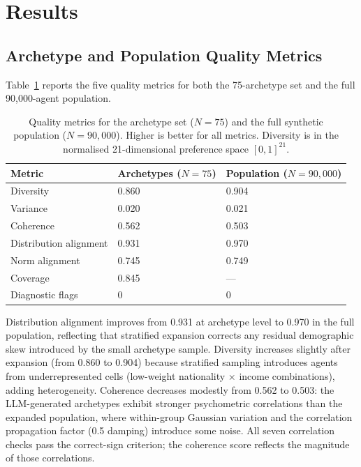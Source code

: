 \documentclass[sustainability,article,submit,pdftex,moreauthors]{Definitions/mdpi}
\begin{document}
\section{Results}
\label{sec:results}

\subsection{Archetype and Population Quality Metrics}
\label{subsec:metrics_results}

Table~\ref{tab:metrics} reports the five quality metrics for both the
75-archetype set and the full 90,000-agent population.

\begin{table}[H]
\caption{Quality metrics for the archetype set ($N = 75$) and the full
synthetic population ($N = 90{,}000$). Higher is better for all metrics.
Diversity is in the normalised 21-dimensional preference space $[0,1]^{21}$.}
\label{tab:metrics}
\begin{tabularx}{\textwidth}{lXX}
\toprule
\textbf{Metric}              & \textbf{Archetypes ($N=75$)} & \textbf{Population ($N=90{,}000$)} \\
\midrule
Diversity                   & 0.860 & 0.904 \\
Variance                    & 0.020 & 0.021 \\
Coherence                   & 0.562 & 0.503 \\
Distribution alignment      & 0.931 & 0.970 \\
Norm alignment              & 0.745 & 0.749 \\
Coverage                    & 0.845 & --- \\
Diagnostic flags            & 0     & 0     \\
\bottomrule
\end{tabularx}
\end{table}

Distribution alignment improves from 0.931 at archetype level to 0.970
in the full population, reflecting that stratified expansion corrects
any residual demographic skew introduced by the small archetype sample.
Diversity increases slightly after expansion (from 0.860 to 0.904) because
stratified sampling introduces agents from underrepresented cells
(low-weight nationality $\times$ income combinations), adding heterogeneity.
Coherence decreases modestly from 0.562 to 0.503: the LLM-generated
archetypes exhibit stronger psychometric correlations than the expanded
population, where within-group Gaussian variation and the correlation
propagation factor (0.5 damping) introduce some noise. All seven
correlation checks pass the correct-sign criterion; the coherence score
reflects the magnitude of those correlations.
\end{document}
